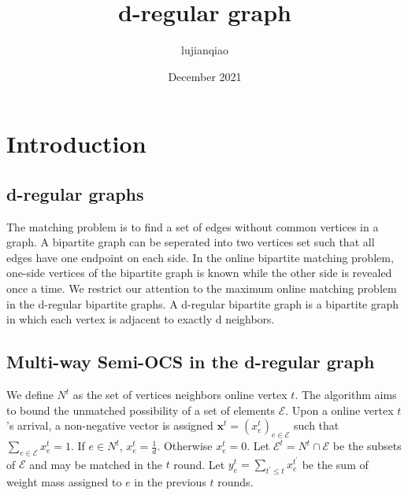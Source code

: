 \documentclass{article}
\title{d-regular graph}
\author{lujianqiao}
\date{December 2021}
\begin{document}
\maketitle

\section{ Introduction}
\subsection{d-regular graphs}

The matching problem is to find a set of edges without common vertices in a graph.
A bipartite graph can be seperated into two vertices set such that all edges have one endpoint on each side. 
In the online bipartite matching problem, one-side vertices of the bipartite graph is known while the other side is revealed once a time.
We restrict our attention to the maximum online matching problem in the d-regular bipartite graphs.
A d-regular bipartite graph is a bipartite graph in which each vertex is adjacent to exactly d neighbors.

\subsection{ Multi-way Semi-OCS in the d-regular graph}

We define $N^t$ as the set of vertices neighbors online vertex $t$. 
The algorithm aims to bound the unmatched possibility of a set of elements $\mathcal{E}$.
Upon a online vertex $t$'s arrival, a non-negative vector is assigned $\boldsymbol{x}^{t}=\left(x_{e}^{t}\right)_{e \in \mathcal{E}}$ such that $\sum_{e \in \mathcal{E}} x_{e}^{t}=1.$
If $e \in N^t$, $x_{e}^{t} = \frac{1}{d}$.
Otherwise $x_{e}^{t} = 0$.
Let $\mathcal{E}^{t}=N^t \cap\mathcal{E} $ be the subsets of $\mathcal{E}$ and may be matched in the $t$ round.
Let $y_{e}^{t}=\sum_{t^{\prime} \leq t} x_{e}^{t^{\prime}}$ be the sum of weight mass assigned to $e$ in the previous $t$ rounds.
\end{document}
